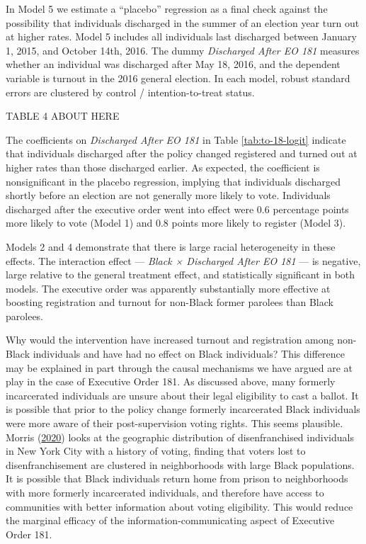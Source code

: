 \documentclass[
  12pt,
]{article}
\begin{document}
In Model 5 we estimate a ``placebo'' regression as a final check against the possibility that individuals discharged in the summer of an election year turn out at higher rates. Model 5 includes all individuals last discharged between January 1, 2015, and October 14th, 2016. The dummy \emph{Discharged After EO 181} measures whether an individual was discharged after May 18, 2016, and the dependent variable is turnout in the 2016 general election. In each model, robust standard errors are clustered by control / intention-to-treat status.

TABLE 4 ABOUT HERE

The coefficients on \emph{Discharged After EO 181} in Table \ref{tab:to-18-logit} indicate that individuals discharged after the policy changed registered and turned out at higher rates than those discharged earlier. As expected, the coefficient is nonsignificant in the placebo regression, implying that individuals discharged shortly before an election are not generally more likely to vote. Individuals discharged after the executive order went into effect were 0.6 percentage points more likely to vote (Model 1) and 0.8 points more likely to register (Model 3).

Models 2 and 4 demonstrate that there is large racial heterogeneity in these effects. The interaction effect --- \emph{Black × Discharged After EO 181} --- is negative, large relative to the general treatment effect, and statistically significant in both models. The executive order was apparently substantially more effective at boosting registration and turnout for non-Black former parolees than Black parolees.

Why would the intervention have increased turnout and registration among non-Black individuals and have had no effect on Black individuals? This difference may be explained in part through the causal mechanisms we have argued are at play in the case of Executive Order 181. As discussed above, many formerly incarcerated individuals are unsure about their legal eligibility to cast a ballot. It is possible that prior to the policy change formerly incarcerated Black individuals were more aware of their post-supervision voting rights. This seems plausible. Morris (\protect\hyperlink{ref-Morris2020}{2020}) looks at the geographic distribution of disenfranchised individuals in New York City with a history of voting, finding that voters lost to disenfranchisement are clustered in neighborhoods with large Black populations. It is possible that Black individuals return home from prison to neighborhoods with more formerly incarcerated individuals, and therefore have access to communities with better information about voting eligibility. This would reduce the marginal efficacy of the information-communicating aspect of Executive Order 181.
\end{document}
